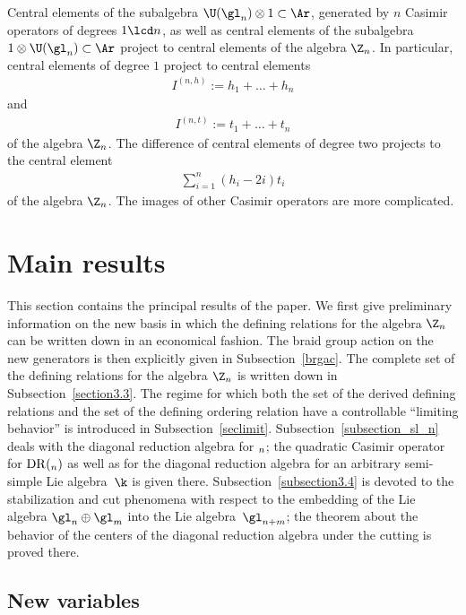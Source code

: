 Central elements of the subalgebra $\U(\gl_n)\otimes 1\subset \Ar$, generated by $n$ Casimir
operators of degrees $1\lcd n$,  as well as central elements of the subalgebra
$1\otimes \U(\gl_n)\subset \Ar$ project to central elements of the algebra $\Z_n$. In particular,
central elements of degree $1$ project to central elements
\begin{gather}
I^{(n,h)}:=h_1+\dots +h_n\label{clih}
\end{gather}
and
\begin{gather}
\label{clit} I^{(n,t)}:=t_1+\dots +t_n
\end{gather}
of the algebra $\Z_n$. The dif\/ference of central elements of degree two projects to the central element
\begin{gather}
\label{drclit}
\sum_{i=1}^n(h_i-2i)t_i
\end{gather}
of the algebra $\Z_n$. The images of other Casimir operators are more complicated.


\section{Main results}

This section contains the principal results of the paper. We f\/irst give
preliminary information on the new basis in which the def\/ining relations for the
algebra $\Z_n$ can be written down in an economical fashion. The braid group action on the new generators is then
explicitly given in Subsection~\ref{brgac}. The complete set of the def\/ining relations for the algebra $\Z_n$ is written down in Subsection~\ref{section3.3}. The regime for which both
the set of the derived def\/ining relations and the set of the def\/ining ordering relation have a controllable ``limiting behavior'' is introduced in Subsection~\ref{seclimit}. Subsection~\ref{subsection_sl_n} deals with the diagonal reduction algebra for $\sl_n$; the quadratic Casimir operator for
${\mathrm{DR}}(\sl_n)$ as well as for the diagonal reduction algebra for an arbitrary semi-simple
Lie algebra~$\k$ is given there. Subsection~\ref{subsection3.4} is devoted to the stabilization and cut phenomena with respect to the embedding of the Lie algebra $\gl_n\oplus\gl_m$ into
the Lie algebra~$\gl_{n+m}$; the theorem about the behavior of the centers of the diagonal reduction algebra under the cutting is proved there.

\subsection{New variables}

